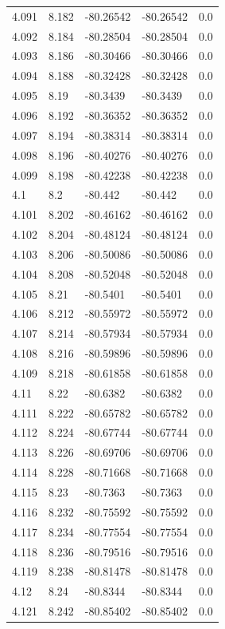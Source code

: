 \begin{tabular}{lllll}
4.091 & 8.182 & -80.26542 & -80.26542 & 0.0 \\
4.092 & 8.184 & -80.28504 & -80.28504 & 0.0 \\
4.093 & 8.186 & -80.30466 & -80.30466 & 0.0 \\
4.094 & 8.188 & -80.32428 & -80.32428 & 0.0 \\
4.095 & 8.19 & -80.3439 & -80.3439 & 0.0 \\
4.096 & 8.192 & -80.36352 & -80.36352 & 0.0 \\
4.097 & 8.194 & -80.38314 & -80.38314 & 0.0 \\
4.098 & 8.196 & -80.40276 & -80.40276 & 0.0 \\
4.099 & 8.198 & -80.42238 & -80.42238 & 0.0 \\
4.1 & 8.2 & -80.442 & -80.442 & 0.0 \\
4.101 & 8.202 & -80.46162 & -80.46162 & 0.0 \\
4.102 & 8.204 & -80.48124 & -80.48124 & 0.0 \\
4.103 & 8.206 & -80.50086 & -80.50086 & 0.0 \\
4.104 & 8.208 & -80.52048 & -80.52048 & 0.0 \\
4.105 & 8.21 & -80.5401 & -80.5401 & 0.0 \\
4.106 & 8.212 & -80.55972 & -80.55972 & 0.0 \\
4.107 & 8.214 & -80.57934 & -80.57934 & 0.0 \\
4.108 & 8.216 & -80.59896 & -80.59896 & 0.0 \\
4.109 & 8.218 & -80.61858 & -80.61858 & 0.0 \\
4.11 & 8.22 & -80.6382 & -80.6382 & 0.0 \\
4.111 & 8.222 & -80.65782 & -80.65782 & 0.0 \\
4.112 & 8.224 & -80.67744 & -80.67744 & 0.0 \\
4.113 & 8.226 & -80.69706 & -80.69706 & 0.0 \\
4.114 & 8.228 & -80.71668 & -80.71668 & 0.0 \\
4.115 & 8.23 & -80.7363 & -80.7363 & 0.0 \\
4.116 & 8.232 & -80.75592 & -80.75592 & 0.0 \\
4.117 & 8.234 & -80.77554 & -80.77554 & 0.0 \\
4.118 & 8.236 & -80.79516 & -80.79516 & 0.0 \\
4.119 & 8.238 & -80.81478 & -80.81478 & 0.0 \\
4.12 & 8.24 & -80.8344 & -80.8344 & 0.0 \\
4.121 & 8.242 & -80.85402 & -80.85402 & 0.0 \\

\end{tabular}
